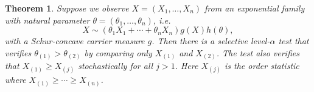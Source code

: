 \documentclass[11pt]{article}
\newtheorem{theorem}{Theorem}
\begin{document}
\begin{theorem}
Suppose we observe $X = \left(X_1, \ldots, X_n\right)$ from an exponential family with natural parameter $\theta = \left(\theta_1, \ldots, \theta_n\right)$, i.e.
$$X \sim \left(\theta_1 X_1 + \cdots + \theta_n X_n\right) g\left(X\right) h\left(\theta\right),$$
with a Schur-concave carrier measure $g$. Then there is a selective level-$\alpha$ test that verifies $\theta_{\left(1\right)} > \theta_{\left(2\right)}$ by comparing only $X_{\left(1\right)}$ and $X_{\left(2\right)}$. The test also verifies that $X_{\left(1\right)} \ge X_{\left(j\right)}$ stochastically for all $j > 1$. Here $X_{\left(j\right)}$ is the order statistic where $X_{\left(1\right)} \ge \cdots \ge X_{\left(n\right)}$.
\label{thm:main_result}
\end{theorem}
\end{document}
